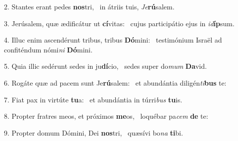 2. Stantes erant pedes \textbf{nos}tri, \ast\  in átriis tuis, \textit{Je}\textbf{rú}salem.\

3. Jerúsalem, quæ ædificátur ut \textbf{cí}vitas: \ast\  cujus participátio ejus in \textit{id}\textbf{íp}sum.\

4. Illuc enim ascendérunt tribus, tribus \textbf{Dó}mini: \ast\  testimónium Israël ad confiténdum nómi\textit{ni} \textbf{Dó}mini.\

5. Quia illic sedérunt sedes in ju\textbf{dí}cio, \ast\  sedes super do\textit{mum} \textbf{Da}vid.\

6. Rogáte quæ ad pacem sunt Je\textbf{rú}salem: \ast\  et abundántia diligén\textit{ti}\textbf{bus} te:\

7. Fiat pax in virtúte \textbf{tu}a: \ast\  et abundántia in túrri\textit{bus} \textbf{tu}is.\

8. Propter fratres meos, et próximos \textbf{me}os, \ast\  loquébar pa\textit{cem} \textbf{de} te:\

9. Propter domum Dómini, Dei \textbf{nos}tri, \ast\  quæsívi bo\textit{na} \textbf{ti}bi.\

